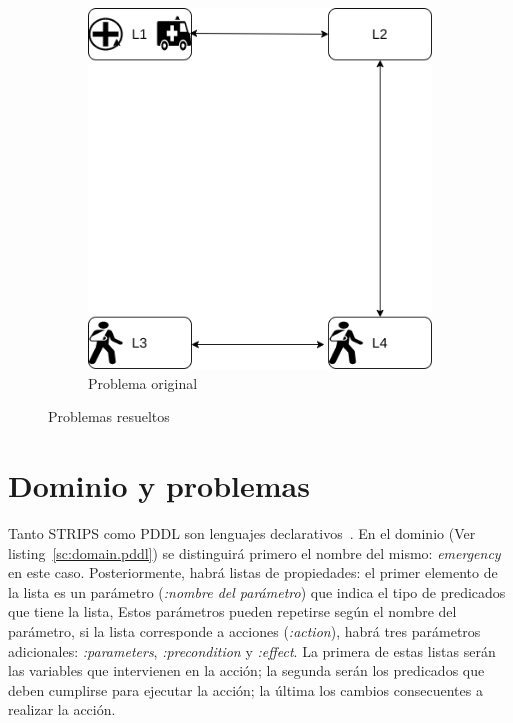 \documentclass[a4paper,12pt]{article}
\begin{document}
\begin{figure}[!ht]
\begin{subfigure}[b]{0.45\textwidth}
         \includegraphics[width=\textwidth]{im/original}
         \caption{Problema original}
         \label{fig:original}
     \end{subfigure}
        \caption{Problemas resueltos}
        \label{fig:problemas}
\end{figure}

\section{Dominio y problemas}

Tanto STRIPS como PDDL son lenguajes declarativos~\citep{Dominguez2017}. En el dominio (Ver listing~\ref{sc:domain.pddl}) se distinguirá primero el nombre del mismo: \emph{emergency} en este caso. Posteriormente, habrá listas de propiedades: el primer elemento de la lista es un parámetro (\emph{:nombre del parámetro}) que indica el tipo de predicados que tiene la lista, Estos parámetros pueden repetirse según el nombre del parámetro, si la lista corresponde a acciones (\emph{:action}), habrá tres parámetros adicionales: \emph{:parameters}, \emph{:precondition} y \emph{:effect}. La primera de estas listas serán las variables que intervienen en la acción; la segunda serán los predicados que deben cumplirse para ejecutar la acción; la última los cambios consecuentes a realizar la acción.
\end{document}
